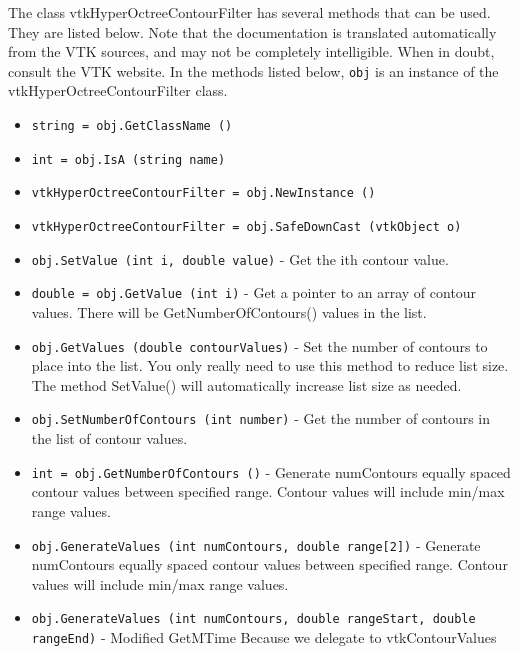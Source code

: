 The class vtkHyperOctreeContourFilter has several methods that can be used.
  They are listed below.
Note that the documentation is translated automatically from the VTK sources,
and may not be completely intelligible.  When in doubt, consult the VTK website.
In the methods listed below, \verb|obj| is an instance of the vtkHyperOctreeContourFilter class.
\begin{itemize}
\item  \verb|string = obj.GetClassName ()|

\item  \verb|int = obj.IsA (string name)|

\item  \verb|vtkHyperOctreeContourFilter = obj.NewInstance ()|

\item  \verb|vtkHyperOctreeContourFilter = obj.SafeDownCast (vtkObject o)|

\item  \verb|obj.SetValue (int i, double value)| -  Get the ith contour value.

\item  \verb|double = obj.GetValue (int i)| -  Get a pointer to an array of contour values. There will be
 GetNumberOfContours() values in the list.

\item  \verb|obj.GetValues (double contourValues)| -  Set the number of contours to place into the list. You only really
 need to use this method to reduce list size. The method SetValue()
 will automatically increase list size as needed.

\item  \verb|obj.SetNumberOfContours (int number)| -  Get the number of contours in the list of contour values.

\item  \verb|int = obj.GetNumberOfContours ()| -  Generate numContours equally spaced contour values between specified
 range. Contour values will include min/max range values.

\item  \verb|obj.GenerateValues (int numContours, double range[2])| -  Generate numContours equally spaced contour values between specified
 range. Contour values will include min/max range values.

\item  \verb|obj.GenerateValues (int numContours, double rangeStart, double rangeEnd)| -  Modified GetMTime Because we delegate to vtkContourValues


\end{itemize}
